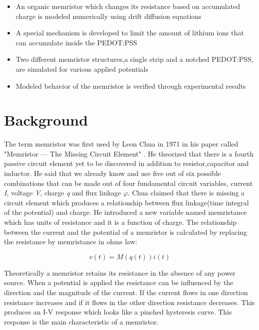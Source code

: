 \begin{doublespace}
\begin{itemize}
  \item An organic memristor which changes its resistance based on accumulated charge is modeled numerically using drift diffusion equations  
  \item A special mechanism is developed to limit the amount of lithium ions that can accumulate inside the PEDOT:PSS
  \item Two different memristor structures,a single strip and a notched PEDOT:PSS, are simulated for various applied potentials
  \item Modeled behavior of the memristor is verified through experimental results 
\end{itemize}

\section{Background}
The term memristor was first used by Leon Chua in 1971 in his paper called  "Memristor — The Missing Circuit Element" \cite{chua}. He theorized that there is a fourth passive circuit element yet to be discovered in addition to resistor,capacitor and inductor. He said that we already know and use five out of six possible combinations that can be made out of four fundamental circuit variables, current \textit{I}, voltage \textit{V}, charge \textit{q} and flux linkage \textit{$\varphi$}. Chua claimed that there is missing a circuit element which produces a relationship between flux linkage(time integral of the potential) and charge. He introduced a new variable named memristance which has units of resistance and it is a function of charge. The relationship between the current and the potential of a memristor is calculated by replacing the resistance by memristance in ohms law:


\begin{equation}
v(t)=M(q(t))i(t)
\end{equation}

Theoretically a memristor retains its resistance in the absence of any power source. When a potential is applied the resistance can be influenced by the direction and the magnitude of the current. If the current flows in one direction resistance increases and if it flows in the other direction resistance decreases. This produces an I-V response which looks like a pinched hysteresis curve. This response is the main characteristic of a memristor. 


\end{doublespace}
